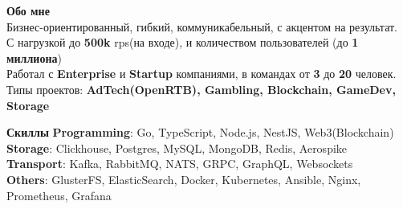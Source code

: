 \documentclass{resume}
\begin{document}

\begin{rSection}{\textbf{Обо мне}}
{
\\  Бизнес-ориентированный, гибкий, коммуникабельный, с акцентом на результат.
\\  С нагрузкой до \textbf{500k} rps(на входе), и количеством пользователей (до \textbf{1 миллиона})
\\  Работал с \textbf{Enterprise} и \textbf{Startup} компаниями, в командах от \textbf{3} до \textbf{20} человек.
\\  Типы проектов: \textbf{AdTech(OpenRTB), Gambling, Blockchain, GameDev, Storage}
}

\end{rSection}
\begin{rSection}{\textbf{Скиллы}}
    \textbf{Programming}: Go, TypeScript, Node.js, NestJS, Web3(Blockchain)
    \\ \textbf{Storage}: Clickhouse, Postgres, MySQL, MongoDB, Redis, Aerospike
    \\ \textbf{Transport}: Kafka, RabbitMQ, NATS, GRPC, GraphQL, Websockets
    \\ \textbf{Others}: GlusterFS, ElasticSearch, Docker, Kubernetes, Ansible, Nginx, Prometheus, Grafana
\end{rSection}
\end{document}
